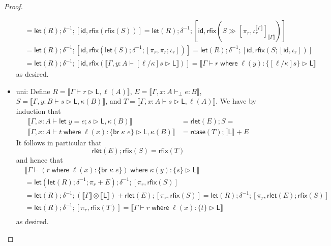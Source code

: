 \documentclass[acmsmall,screen,review]{acmart}
\newcommand{\ms}[1]{\ensuremath{\mathsf{#1}}}
\newcommand{\lto}{:}
\newcommand{\letstmt}[3]{\ensuremath{\ms{let}\;#1 = #2; #3}}
\newcommand{\brb}[2]{\ms{br}\;#1\;#2}
\newcommand{\where}[2]{#1\;\ms{where}\;#2}
\newcommand{\wbranch}[3]{#1(#2) \lto \{#3\}}
\newcommand{\bhyp}[2]{#1 : #2}
\newcommand{\hasty}[4]{#1 \vdash_{#2} #3: {#4}}
\newcommand{\haslb}[3]{#1 \vdash #2 \rhd #3}
\newcommand{\brle}[1]{{\textsf{#1}}}
\newcommand{\dnt}[1]{\llbracket{#1}\rrbracket}
\newcommand{\lmor}[1]{\ms{let}(#1)}
\newcommand{\rlmor}[1]{\ms{rlet}(#1)}
\newcommand{\rcase}[1]{\ms{rcase}(#1)}
\newcommand{\rfix}[1]{\ms{rfix}(#1)}
\newcommand{\rseq}[3]{#2 \gg_{#1} #3}
\newcommand{\envcop}[3]{[#2, #3]_{#1}}
\newcommand{\envinr}[1]{\iota^{#1}_{r}}
\begin{document}
\begin{proof}
\begin{itemize}[leftmargin=*]
\begin{equation}
\begin{aligned}
      & = \lmor{R} ; \delta^{-1} ; [\ms{id}, \rfix{\rfix{S}}]
        = \lmor{R} ; \delta^{-1} ; 
          [\ms{id}, \rfix{\rseq{}{S}{\envcop{\dnt{\Gamma}}{\pi_r}{\envinr{\dnt{\Gamma}}}}}] \\
      & = \lmor{R} ; \delta^{-1} ; 
          [\ms{id}, \rfix{\lmor{S} ; \delta^{-1} ; [\pi_r, \pi_r ; \iota_r]}]
        = \lmor{R} ; \delta^{-1} ; 
          [\ms{id}, \rfix{S ; [\ms{id}, \iota_r]}] \\
      & = \lmor{R} ; \delta^{-1} ; 
      [\ms{id}, \rfix{\dnt{\haslb{\Gamma, \bhyp{y}{A}}{[\ell/\kappa]s}{\ms{L}}}}]
        = \dnt{\haslb{\Gamma}{\where{r}{\wbranch{\ell}{y}{[\ell/\kappa]s}}}{\ms{L}}}
      \end{aligned}
    \end{equation}
    as desired.

    \item \brle{uni}: 
    Define $R = \dnt{\haslb{\Gamma}{r}{\ms{L}, \ell(A)}}$, %
           $E = \dnt{\hasty{\Gamma, \bhyp{x}{A}}{\bot}{e}{B}}$, %
           $S = \dnt{\haslb{\Gamma, \bhyp{y}{B}}{s}{\ms{L}, \kappa(B)}}$, and %
           $T = \dnt{\haslb{\Gamma, \bhyp{x}{A}}{s}{\ms{L}, \ell(A)}}$. %
    We have by induction that
    \begin{equation}
      \begin{aligned}
        \dnt{\haslb{\Gamma, \bhyp{x}{A}}{\letstmt{y}{e}{s}}{\ms{L}, \kappa(B)}}
        &= \rlmor{E} ; S = \\
        \dnt{\haslb{\Gamma, \bhyp{x}{A}}
          {\where{t}{\wbranch{\ell}{x}{\brb{\kappa}{e}}}}{\ms{L}, \kappa(B)}}
        &= \rcase{T} ; \dnt{\ms{L}} + E  
      \end{aligned}
    \end{equation}
    It follows in particular that
    \begin{equation}
      \rlmor{E} ; \rfix{S} = \rfix{T}
    \end{equation}
    and hence that
    \begin{equation}
      \begin{aligned}
        & \dnt{
          \haslb{\Gamma}
          {\where{(\where{r}{\wbranch{\ell}{x}{\brb{\kappa}{e}}})}{\wbranch{\kappa}{y}{s}}}
          {\ms{L}}} \\
        & = \lmor{\lmor{R} ; \delta^{-1} ; \pi_r + E}
          ; \delta^{-1} ; [\pi_r, \rfix{S}] \\
        & = \lmor{R} ; \delta^{-1} 
          ; (\dnt{\Gamma} \otimes \dnt{\ms{L}}) + \rlmor{E} 
          ; [\pi_r, \rfix{S}]
          = \lmor{R} ; \delta^{-1}
          ; [\pi_r, \rlmor{E} ; \rfix{S}] \\
        & = \lmor{R} ; \delta^{-1}
          ; [\pi_r, \rfix{T}]
          = \dnt{\haslb{\Gamma}{\where{r}{\wbranch{\ell}{x}{t}}}{\ms{L}}} \\
      \end{aligned}
    \end{equation}
    as desired.
    

\end{itemize}
\end{proof}
\end{document}

